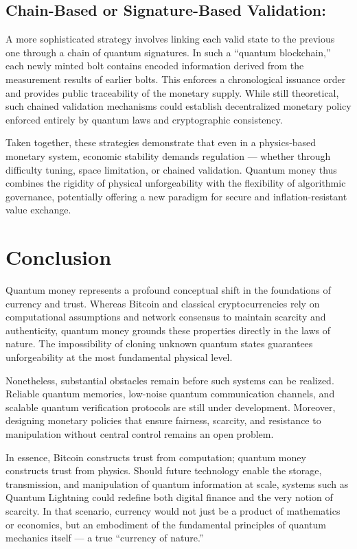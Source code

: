 \subsection{Chain-Based or Signature-Based Validation:}\label{s:2.1}
A more sophisticated strategy involves linking each valid state to the previous one through a chain of quantum signatures. In such a “quantum blockchain,” each newly minted bolt contains encoded information derived from the measurement results of earlier bolts. This enforces a chronological issuance order and provides public traceability of the monetary supply. While still theoretical, such chained validation mechanisms could establish decentralized monetary policy enforced entirely by quantum laws and cryptographic consistency.

Taken together, these strategies demonstrate that even in a physics-based monetary system, economic stability demands regulation — whether through difficulty tuning, space limitation, or chained validation. Quantum money thus combines the rigidity of physical unforgeability with the flexibility of algorithmic governance, potentially offering a new paradigm for secure and inflation-resistant value exchange.

\section{Conclusion}\label{s:2.1}
Quantum money represents a profound conceptual shift in the foundations of currency and trust. Whereas Bitcoin and classical cryptocurrencies rely on computational assumptions and network consensus to maintain scarcity and authenticity, quantum money grounds these properties directly in the laws of nature. The impossibility of cloning unknown quantum states guarantees unforgeability at the most fundamental physical level.

Nonetheless, substantial obstacles remain before such systems can be realized. Reliable quantum memories, low-noise quantum communication channels, and scalable quantum verification protocols are still under development. Moreover, designing monetary policies that ensure fairness, scarcity, and resistance to manipulation without central control remains an open problem.

In essence, Bitcoin constructs trust from computation; quantum money constructs trust from physics. Should future technology enable the storage, transmission, and manipulation of quantum information at scale, systems such as Quantum Lightning could redefine both digital finance and the very notion of scarcity. In that scenario, currency would not just be a product of mathematics or economics, but an embodiment of the fundamental principles of quantum mechanics itself — a true “currency of nature.”
\printbibliography


